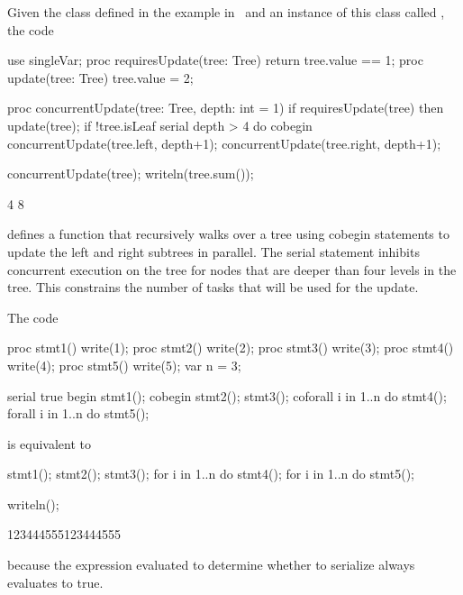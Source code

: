 \begin{example}
Given the  class defined in the example
in~ and an instance of this class
called , the code
\begin{chapelpre}
use singleVar;
proc requiresUpdate(tree: Tree) {
  return tree.value == 1;
}
proc update(tree: Tree) {
  tree.value = 2;
}
\end{chapelpre}
\begin{chapel}
proc concurrentUpdate(tree: Tree, depth: int = 1) {
  if requiresUpdate(tree) then
    update(tree);
  if !tree.isLeaf {
    serial depth > 4 do cobegin {
      concurrentUpdate(tree.left, depth+1);
      concurrentUpdate(tree.right, depth+1);
    }
  }
}
\end{chapel}
\begin{chapelpost}
concurrentUpdate(tree);
writeln(tree.sum());
\end{chapelpost}
\begin{chapeloutput}
4
8
\end{chapeloutput}
defines a function  that recursively walks over
a tree using cobegin statements to update the left and right subtrees
in parallel.  The serial statement inhibits concurrent execution on
the tree for nodes that are deeper than four levels in the tree.  This
constrains the number of tasks that will be used for the update.
\end{example}

\begin{example}
The code
\begin{chapelpre}
proc stmt1() { write(1); }
proc stmt2() { write(2); }
proc stmt3() { write(3); }
proc stmt4() { write(4); }
proc stmt5() { write(5); }
var n = 3;
\end{chapelpre}
\begin{chapel}
serial true {
  begin stmt1();
  cobegin {
    stmt2();
    stmt3();
  }
  coforall i in 1..n do stmt4();
  forall i in 1..n do stmt5();
}
\end{chapel}
is equivalent to
\begin{chapel}
stmt1();
{
  stmt2();
  stmt3();
}
for i in 1..n do stmt4();
for i in 1..n do stmt5();
\end{chapel}
\begin{chapelpost}
writeln();
\end{chapelpost}
\begin{chapeloutput}
123444555123444555
\end{chapeloutput}
because the expression evaluated to determine whether to serialize
always evaluates to true.
\end{example}

